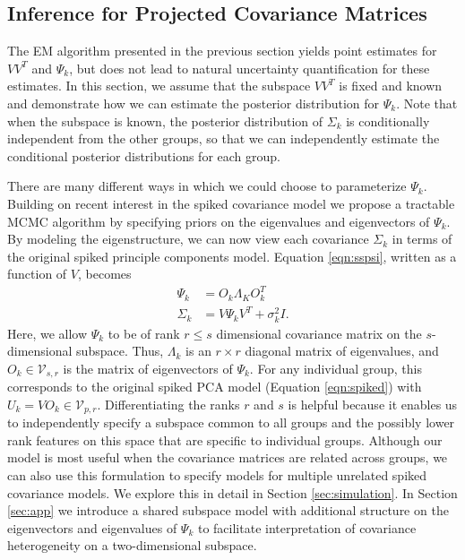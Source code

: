 \documentclass[12pt]{article}
\begin{document}
\subsection{Inference for Projected Covariance Matrices}
\label{sec:bayes}

The EM algorithm presented in the previous section yields point
estimates for $VV^T$ and $\Psi_k$, but does not lead to natural
uncertainty quantification for these estimates.  In this section, we
assume that the subspace $VV^T$ is fixed and known and demonstrate how
we can estimate the posterior distribution for $\Psi_k$.   Note that when
the subspace is known, the posterior distribution of $\Sigma_k$ is
conditionally independent from the other groups, so that we can
independently estimate the conditional posterior distributions for each
group.


There are many different ways in which we could choose to parameterize
$\Psi_k$.  Building on recent interest in the spiked covariance model
\citep{Donoho2013, Paul2007} we propose a tractable MCMC algorithm by
specifying priors on the eigenvalues and eigenvectors of $\Psi_k$.  By
modeling the eigenstructure, we can now view each covariance
$\Sigma_k$ in terms of the original spiked principle components model.  Equation \ref{eqn:sspsi}, written as a function of
$V$, becomes
%
\begin{align}
\nonumber \Psi_k &= O_k\Lambda_KO_k^T\\
\Sigma_k &= V\Psi_kV^T + \sigma^2_kI.
\label{eqn:ss}
\end{align}
%
\noindent Here, we allow $\Psi_k$ to be of rank $r \leq s$ dimensional
covariance matrix on the $s$-dimensional subspace.  Thus, $\Lambda_k$
is an $r \times r$ diagonal matrix of eigenvalues, and
$O_k \in \mathcal{V}_{s,r}$ is the matrix of eigenvectors of $\Psi_k$.
For any individual group, this corresponds to the original spiked PCA
model (Equation \ref{eqn:spiked}) with
$U_k = VO_k \in \mathcal{V}_{p, r}$.  Differentiating the ranks $r$
and $s$ is helpful because it enables us to independently specify a
subspace common to all groups and the possibly lower rank features on
this space that are specific to individual groups.  Although our model
is most useful when the covariance matrices are related across groups,
we can also use this formulation to specify models for multiple
unrelated spiked covariance models.  We explore this in detail in
Section \ref{sec:simulation}.  In Section \ref{sec:app} we introduce a
shared subspace model with additional structure on the eigenvectors
and eigenvalues of $\Psi_k$ to facilitate interpretation of covariance
heterogeneity on a two-dimensional subspace.
\end{document}
